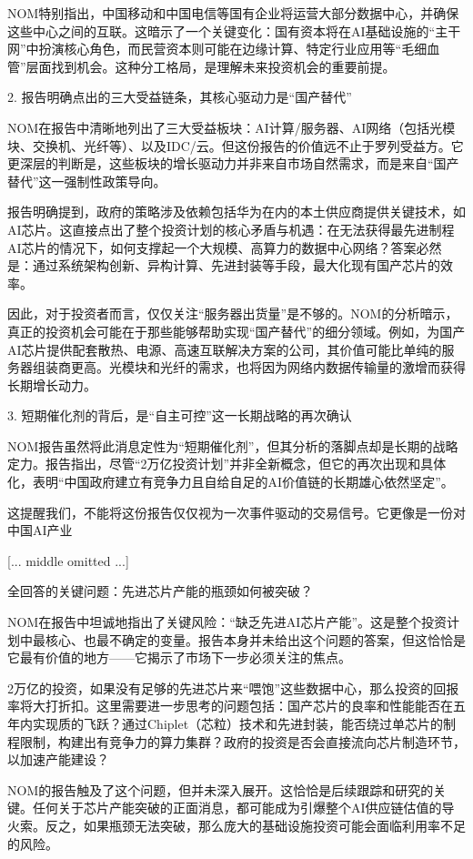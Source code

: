 \documentclass[11pt]{ctexart}
\begin{document}
NOM特别指出，中国移动和中国电信等国有企业将运营大部分数据中心，并确保这些中心之间的互联。这暗示了一个关键变化：国有资本将在AI基础设施的“主干网”中扮演核心角色，而民营资本则可能在边缘计算、特定行业应用等“毛细血管”层面找到机会。这种分工格局，是理解未来投资机会的重要前提。

2. 报告明确点出的三大受益链条，其核心驱动力是“国产替代”

NOM在报告中清晰地列出了三大受益板块：AI计算/服务器、AI网络（包括光模块、交换机、光纤等）、以及IDC/云。但这份报告的价值远不止于罗列受益方。它更深层的判断是，这些板块的增长驱动力并非来自市场自然需求，而是来自“国产替代”这一强制性政策导向。

报告明确提到，政府的策略涉及依赖包括华为在内的本土供应商提供关键技术，如AI芯片。这直接点出了整个投资计划的核心矛盾与机遇：在无法获得最先进制程AI芯片的情况下，如何支撑起一个大规模、高算力的数据中心网络？答案必然是：通过系统架构创新、异构计算、先进封装等手段，最大化现有国产芯片的效率。

因此，对于投资者而言，仅仅关注“服务器出货量”是不够的。NOM的分析暗示，真正的投资机会可能在于那些能够帮助实现“国产替代”的细分领域。例如，为国产AI芯片提供配套散热、电源、高速互联解决方案的公司，其价值可能比单纯的服务器组装商更高。光模块和光纤的需求，也将因为网络内数据传输量的激增而获得长期增长动力。

3. 短期催化剂的背后，是“自主可控”这一长期战略的再次确认

NOM报告虽然将此消息定性为“短期催化剂”，但其分析的落脚点却是长期的战略定力。报告指出，尽管“2万亿投资计划”并非全新概念，但它的再次出现和具体化，表明“中国政府建立有竞争力且自给自足的AI价值链的长期雄心依然坚定”。

这提醒我们，不能将这份报告仅仅视为一次事件驱动的交易信号。它更像是一份对中国AI产业

[... middle omitted ...]

全回答的关键问题：先进芯片产能的瓶颈如何被突破？

NOM在报告中坦诚地指出了关键风险：“缺乏先进AI芯片产能”。这是整个投资计划中最核心、也最不确定的变量。报告本身并未给出这个问题的答案，但这恰恰是它最有价值的地方——它揭示了市场下一步必须关注的焦点。

2万亿的投资，如果没有足够的先进芯片来“喂饱”这些数据中心，那么投资的回报率将大打折扣。这里需要进一步思考的问题包括：国产芯片的良率和性能能否在五年内实现质的飞跃？通过Chiplet（芯粒）技术和先进封装，能否绕过单芯片的制程限制，构建出有竞争力的算力集群？政府的投资是否会直接流向芯片制造环节，以加速产能建设？

NOM的报告触及了这个问题，但并未深入展开。这恰恰是后续跟踪和研究的关键。任何关于芯片产能突破的正面消息，都可能成为引爆整个AI供应链估值的导火索。反之，如果瓶颈无法突破，那么庞大的基础设施投资可能会面临利用率不足的风险。
\end{document}
